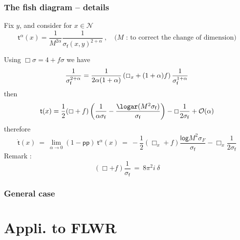 \documentclass[9pt]{beamer}
\renewcommand{\log}{\mathsf{log}} %
\newcommand{\pp}{\mathsf{pp}} %
\newcommand{\Ncal}{\mathcal{N}}
\newcommand{\Ocal}{\mathcal{O}}
\newcommand{\fsf}{\mathsf{f}}
\newcommand{\tsf}{\mathsf{t}}
\begin{document}
\begin{frame}

\frametitle{The fish diagram -- details}
 
Fix $y$, and consider for $x \in \Ncal$
\begin{equation*}
\tsf^\alpha(x) = \frac{1}{M^{2\alpha}} \frac{1}{\sigma_\fsf(x,y)^{2+\alpha}} \ , \quad \mbox{($M$ : to correct the change of dimension)}
\end{equation*}

Using $\Box \sigma = 4 + f \sigma$ we have
%
\begin{equation*}
\frac{1}{\sigma_\fsf^{2+\alpha}}=\frac{1}{2\alpha(1+\alpha)}\left(\Box_x+(1+\alpha)f\right)\frac{1}{\sigma_\fsf^{1+\alpha}} 
\vspace*{-6pt}
\end{equation*}
%
then
%
\begin{equation*}
 \tsf(x) = \frac{1}{2} (\Box + f) \left( \frac{1}{\alpha \sigma_\fsf} - \frac{\logar(M^2\sigma_\fsf)}{\sigma_\fsf} \right) - \Box\frac{1}{2\sigma_\fsf}  + \Ocal(\alpha)
\end{equation*}
%
therefore
%
\vspace*{-6pt}
%
\begin{equation*}
\dot{\tsf}(x) \ = \ \lim_{\alpha\to 0}\left(1-\pp\right) \ \tsf^\alpha(x) \ = \ - \frac{1}{2}(\Box_x+f)\frac{\log M^2 \sigma_F}{\sigma_\fsf}-\Box_x \frac{1}{2\sigma_\fsf} 
\end{equation*}
%
Remark :
%
\vspace*{-8pt}
%
\begin{equation*}
\left( \Box + f \right) \frac{1}{\sigma_\fsf} \ = \ 8 \pi^2 i \ \delta
\end{equation*}

\end{frame}


\begin{frame}
 
\frametitle{General case}
\end{frame}

\section{Appli. to FLWR}
\end{document}
